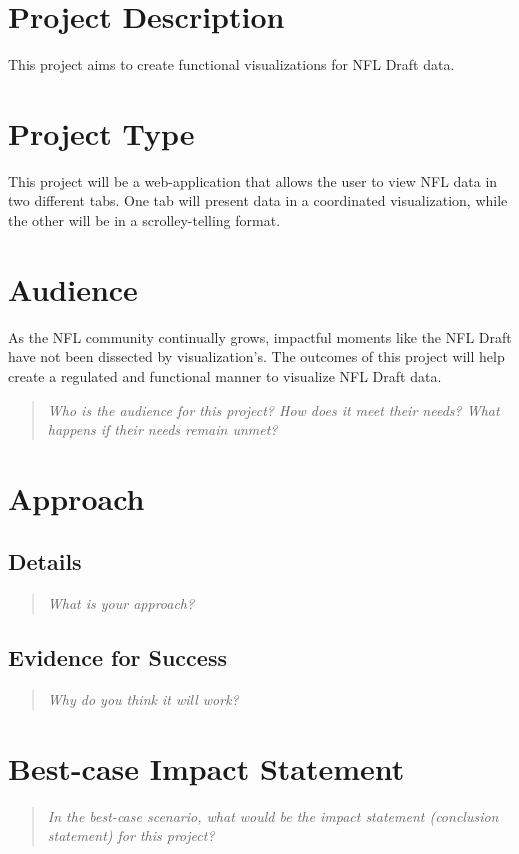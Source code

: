\documentclass{proc}
\begin{document}
\section{Project Description}
This project aims to create functional visualizations for NFL Draft data. 
\section{Project Type}
This project will be a web-application that allows the user to view NFL data in two different tabs. One tab will present data in a coordinated visualization, while the other will be in a scrolley-telling format. 
\section{Audience} 
As the NFL community continually grows, impactful moments like the NFL Draft have not been dissected by visualization's. The outcomes of this project will help create a regulated and functional manner to visualize NFL Draft data. 
\begin{quote}
\textit{Who is the audience for this project? 
How does it meet their needs? 
What happens if their needs remain unmet?}
\end{quote}

\section{Approach}
\subsection{Details}
\begin{quote}
\textit{What is your approach?}

\end{quote}

\subsection{Evidence for Success}
\begin{quote}
\textit{Why do you think it will work?} 
\end{quote}


\section{Best-case Impact Statement}
\begin{quote}
\textit{In the best-case scenario, what would be the impact statement (conclusion statement) for this project? \cite{wijk2005value}}
\end{quote}
\end{document}
